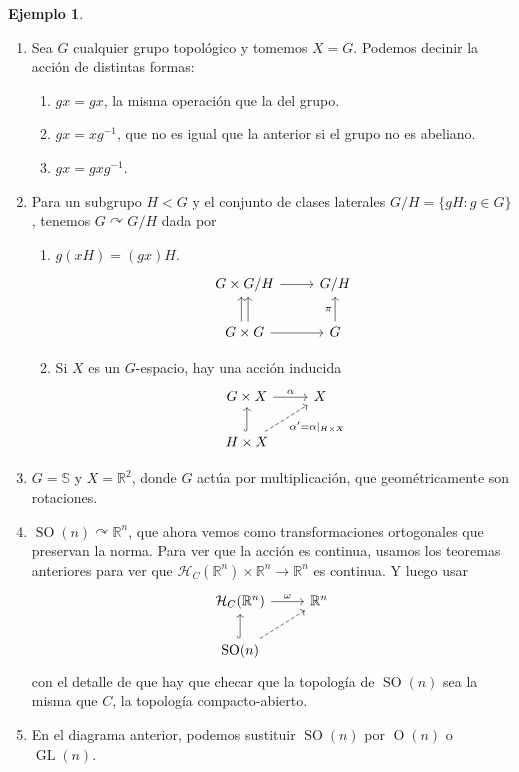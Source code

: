 \documentclass[spanish]{article}
\theoremstyle{definition}
\newtheorem*{ejem}{Ejemplo}
\newcommand{\R}{\mathbb{R}}
\newcommand{\SP}{\mathbb{S}}
\newcommand{\Hom}{\mathcal{H}}
\DeclareMathOperator{\GL}{GL}
\DeclareMathOperator{\Or}{O}
\DeclareMathOperator{\SO}{SO}
\begin{document}
\begin{ejem}\leavevmode
	\begin{enumerate}
		\item Sea $G$ cualquier grupo topológico y tomemos $X=G$. Podemos decinir la acción de distintas formas:
		\begin{enumerate}
			\item $gx=gx$, la misma operación que la del grupo.
			\item $gx=xg^{-1}$, que no es igual que la anterior si el grupo no es abeliano.
			\item $gx=gxg^{-1}$.
		\end{enumerate}
		\item Para un subgrupo $H<G$ y el conjunto de clases laterales $G/H=\{gH:g\in G\}$, tenemos $G\curvearrowright G/H$ dada por \begin{enumerate}
			\item $g(xH)=(gx)H$.
			\[\begin{tikzcd}
				G\times G/H\arrow[r]&G/H\\
				G\times G\arrow[u,shift left]\arrow[u,shift right]\arrow[r]&G\arrow[u,"\pi"]
			\end{tikzcd}\]
			\item Si $X$ es un $G$-espacio, hay una acción inducida
			\[\begin{tikzcd}
				G\times X\arrow[r,"\alpha"]&X\\
				H\times X\arrow[u,hook]\arrow[dashed,swap,ur,"\alpha'=\alpha|_{H\times X}"]
			\end{tikzcd}\]
		\end{enumerate}
		\item $G=\SP$ y $X=\R^2$, donde $G$ actúa por multiplicación, que geométricamente son rotaciones.
		\item $\SO(n)\curvearrowright\R^n$, que ahora vemos como transformaciones ortogonales que preservan la norma. Para ver que la acción es continua, usamos los teoremas anteriores para ver que $\Hom_C(\R^n)\times \R^n\to\R^n$ es continua. Y luego usar
		\[\begin{tikzcd}
			\Hom_C(\R^n)\arrow[r,"\omega"]&\R^n\\
			\SO(n)\arrow[hook,u]\arrow[ur,dashed]
		\end{tikzcd}\]
		con el detalle de que hay que checar que la topología de $\SO(n)$ sea la misma que $C$, la topología compacto-abierto.
		\item En el diagrama anterior, podemos sustituir $\SO(n)$ por $\Or(n)$ o $\GL(n)$.
	\end{enumerate}
\end{ejem}
\end{document}
